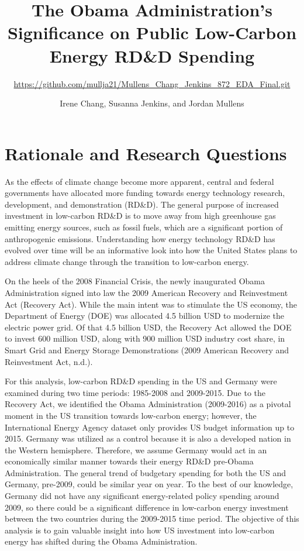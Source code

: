 \documentclass[
  12pt,
]{article}
\title{The Obama Administration's Significance on Public Low-Carbon
Energy RD\&D Spending}
\subtitle{\url{https://github.com/mullja21/Mullens_Chang_Jenkins_872_EDA_Final.git}}
\author{Irene Chang, Susanna Jenkins, and Jordan Mullens}
\date{}
\begin{document}
\maketitle

\newpage
\tableofcontents 
\newpage
\listoftables 
\newpage
\listoffigures 
\newpage

\hypertarget{rationale-and-research-questions}{%
\section{Rationale and Research
Questions}\label{rationale-and-research-questions}}

As the effects of climate change become more apparent, central and
federal governments have allocated more funding towards energy
technology research, development, and demonstration (RD\&D). The general
purpose of increased investment in low-carbon RD\&D is to move away from
high greenhouse gas emitting energy sources, such as fossil fuels, which
are a significant portion of anthropogenic emissions. Understanding how
energy technology RD\&D has evolved over time will be an informative
look into how the United States plans to address climate change through
the transition to low-carbon energy.

On the heels of the 2008 Financial Crisis, the newly inaugurated Obama
Administration signed into law the 2009 American Recovery and
Reinvestment Act (Recovery Act). While the main intent was to stimulate
the US economy, the Department of Energy (DOE) was allocated 4.5 billion
USD to modernize the electric power grid. Of that 4.5 billion USD, the
Recovery Act allowed the DOE to invest 600 million USD, along with 900
million USD industry cost share, in Smart Grid and Energy Storage
Demonstrations (2009 American Recovery and Reinvestment Act, n.d.).

For this analysis, low-carbon RD\&D spending in the US and Germany were
examined during two time periods: 1985-2008 and 2009-2015. Due to the
Recovery Act, we identified the Obama Administration (2009-2016) as a
pivotal moment in the US transition towards low-carbon energy; however,
the International Energy Agency dataset only provides US budget
information up to 2015. Germany was utilized as a control because it is
also a developed nation in the Western hemisphere. Therefore, we assume
Germany would act in an economically similar manner towards their energy
RD\&D pre-Obama Administration. The general trend of budgetary spending
for both the US and Germany, pre-2009, could be similar year on year. To
the best of our knowledge, Germany did not have any significant
energy-related policy spending around 2009, so there could be a
significant difference in low-carbon energy investment between the two
countries during the 2009-2015 time period. The objective of this
analysis is to gain valuable insight into how US investment into
low-carbon energy has shifted during the Obama Administration.
\end{document}
